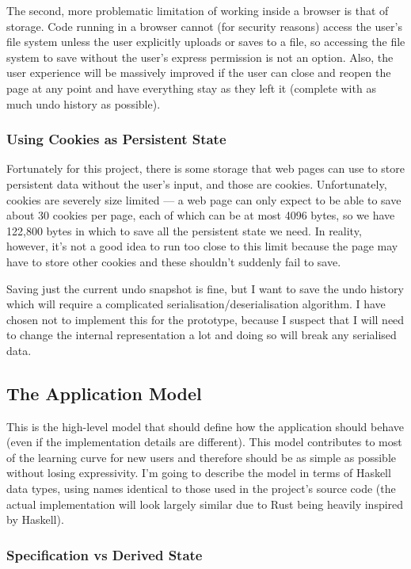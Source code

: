 \documentclass[12pt]{article}
\begin{document}
The second, more problematic limitation of working inside a browser is that of storage.  Code
running in a browser cannot (for security reasons) access the user's file system unless the user
explicitly uploads or saves to a file, so accessing the file system to save without the user's
express permission is not an option.  Also, the user experience will be massively improved if the
user can close and reopen the page at any point and have everything stay as they left it (complete
with as much undo history as possible).

\subsubsection{Using Cookies as Persistent State}

Fortunately for this project, there is some storage that web pages can use to store persistent data
without the user's input, and those are cookies.  Unfortunately, cookies are severely size limited
--- a web page can only expect to be able to save about 30 cookies per page, each of which can be at
most 4096 bytes, so we have 122,800 bytes in which to save all the persistent state we need.  In
reality, however, it's not a good idea to run too close to this limit because the page may have to
store other cookies and these shouldn't suddenly fail to save.

Saving just the current undo snapshot is fine, but I want to save the undo history which will
require a complicated serialisation/deserialisation algorithm.  I have chosen not to implement this
for the prototype, because I suspect that I will need to change the internal representation a lot
and doing so will break any serialised data.

\subsection{The Application Model}

This is the high-level model that should define how the application should behave (even if the
implementation details are different).  This model contributes to most of the learning curve for new
users and therefore should be as simple as possible without losing expressivity.  I'm going to
describe the model in terms of Haskell data types, using names identical to those used in the
project's source code (the actual implementation will look largely similar due to Rust being heavily
inspired by Haskell).

\subsubsection{Specification vs Derived State}
\end{document}
